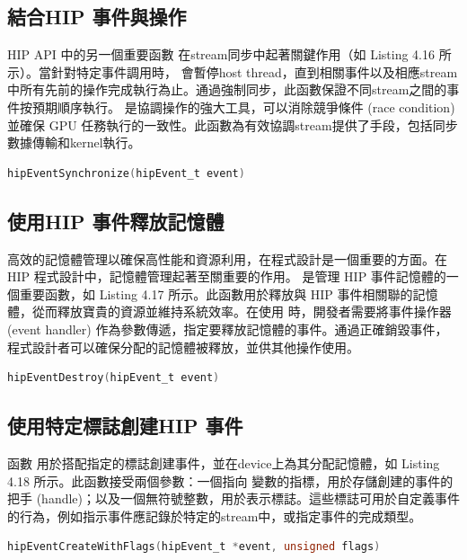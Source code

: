 \subsection{結合HIP 事件與操作}
HIP API 中的另一個重要函數  在stream同步中起著關鍵作用（如 Listing 4.16 所示）。當針對特定事件調用時， 會暫停host thread，直到相關事件以及相應stream中所有先前的操作完成執行為止。通過強制同步，此函數保證不同stream之間的事件按預期順序執行。 是協調操作的強大工具，可以消除競爭條件 (race condition) 並確保 GPU 任務執行的一致性。此函數為有效協調stream提供了手段，包括同步數據傳輸和kernel執行。

\begin{lstlisting}[language=C, caption={使用 hipEventSynchronize()
合併操作}, label={16th:example}]
hipEventSynchronize(hipEvent_t event)
\end{lstlisting}

\subsection{使用HIP 事件釋放記憶體}
高效的記憶體管理以確保高性能和資源利用，在程式設計是一個重要的方面。在 HIP 程式設計中，記憶體管理起著至關重要的作用。 是管理 HIP 事件記憶體的一個重要函數，如 Listing 4.17 所示。此函數用於釋放與 HIP 事件相關聯的記憶體，從而釋放寶貴的資源並維持系統效率。在使用  時，開發者需要將事件操作器 (event handler) 作為參數傳遞，指定要釋放記憶體的事件。通過正確銷毀事件，程式設計者可以確保分配的記憶體被釋放，並供其他操作使用。

\begin{lstlisting}[language=C, caption={使用 hipEventDestroy()
釋放記憶體}, label={17th:example}]
hipEventDestroy(hipEvent_t event)
\end{lstlisting}

\subsection{使用特定標誌創建HIP 事件}
函數  用於搭配指定的標誌創建事件，並在device上為其分配記憶體，如 Listing 4.18 所示。此函數接受兩個參數：一個指向  變數的指標，用於存儲創建的事件的把手 (handle)；以及一個無符號整數，用於表示標誌。這些標誌可用於自定義事件的行為，例如指示事件應記錄於特定的stream中，或指定事件的完成類型。

\begin{lstlisting}[language=C, caption={使用 hipEventCreateWithFlags()
創建帶有標誌的事件}, label={18th:example}]
hipEventCreateWithFlags(hipEvent_t *event, unsigned flags)
\end{lstlisting}

